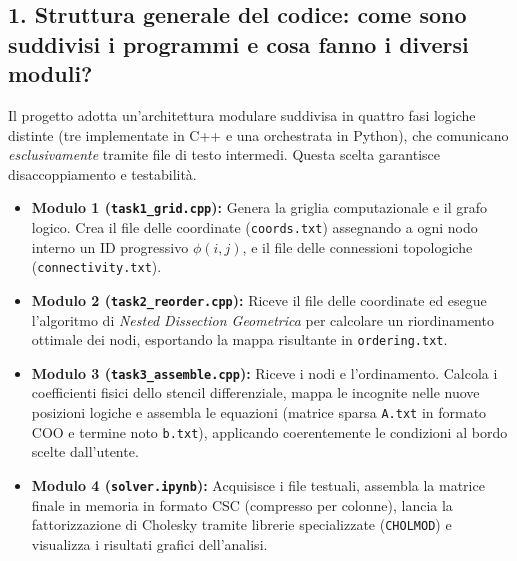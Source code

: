\documentclass[a4paper,11pt]{article}
\theoremstyle{definition}
\begin{document}
\subsection{1. Struttura generale del codice: come sono suddivisi i programmi e cosa fanno i diversi moduli?}
Il progetto adotta un'architettura modulare suddivisa in quattro fasi logiche distinte (tre implementate in C++ e una orchestrata in Python), che comunicano \emph{esclusivamente} tramite file di testo intermedi. Questa scelta garantisce disaccoppiamento e testabilità.
\begin{itemize}
    \item \textbf{Modulo 1 (\texttt{task1\_grid.cpp}):} Genera la griglia computazionale e il grafo logico. Crea il file delle coordinate (\texttt{coords.txt}) assegnando a ogni nodo interno un ID progressivo $\phi(i,j)$, e il file delle connessioni topologiche (\texttt{connectivity.txt}).
    \item \textbf{Modulo 2 (\texttt{task2\_reorder.cpp}):} Riceve il file delle coordinate ed esegue l'algoritmo di \textit{Nested Dissection Geometrica} per calcolare un riordinamento ottimale dei nodi, esportando la mappa risultante in \texttt{ordering.txt}.
    \item \textbf{Modulo 3 (\texttt{task3\_assemble.cpp}):} Riceve i nodi e l'ordinamento. Calcola i coefficienti fisici dello stencil differenziale, mappa le incognite nelle nuove posizioni logiche e assembla le equazioni (matrice sparsa \texttt{A.txt} in formato COO e termine noto \texttt{b.txt}), applicando coerentemente le condizioni al bordo scelte dall'utente.
    \item \textbf{Modulo 4 (\texttt{solver.ipynb}):} Acquisisce i file testuali, assembla la matrice finale in memoria in formato CSC (compresso per colonne), lancia la fattorizzazione di Cholesky tramite librerie specializzate (\texttt{CHOLMOD}) e visualizza i risultati grafici dell'analisi.
\end{itemize}
\end{document}
